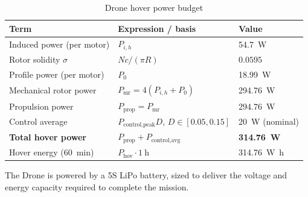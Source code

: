 \begin{table}[!htbp]
    \centering
    \caption{Drone hover power budget}
    \label{tab:drone_power_budget}
    \begin{tabular}{L{5cm} L{4.5cm} R{2.5cm}}
        \toprule
        \textbf{Term} & \textbf{Expression / basis} & \textbf{Value} \\
        \midrule
        Induced power (per motor)   & $P_{i,h}$                                  & \qty{54.7}{\watt} \\
        Rotor solidity $\sigma$     & $Nc/(\pi R)$                                & $0.0595$ \\
        Profile power (per motor)   & $P_0$                                       & \qty{18.99}{\watt} \\
        Mechanical rotor power      & $P_{\text{mr}} = 4(P_{i,h}+P_0)$           & \qty{294.76}{\watt} \\
        Propulsion power            & $P_{\text{prop}} = P_{\text{mr}}$          & \qty{294.76}{\watt} \\
        Control average             & $P_{\text{control,peak}} D$, $D \in [0.05,0.15]$ & \qty{20}{\watt} (nominal) \\
        \textbf{Total hover power}  & $P_{\text{prop}} + P_{\text{control,avg}}$ & \textbf{\qty{314.76}{\watt}} \\
        Hover energy (\qty{60}{\minute}) & $P_{\text{hov}} \cdot \qty{1}{\hour}$  & \qty{314.76}{\watt\hour} \\
        \bottomrule
    \end{tabular}
\end{table}

The Drone is powered by a 5S LiPo battery, sized to deliver the voltage and
energy capacity required to complete the mission.

